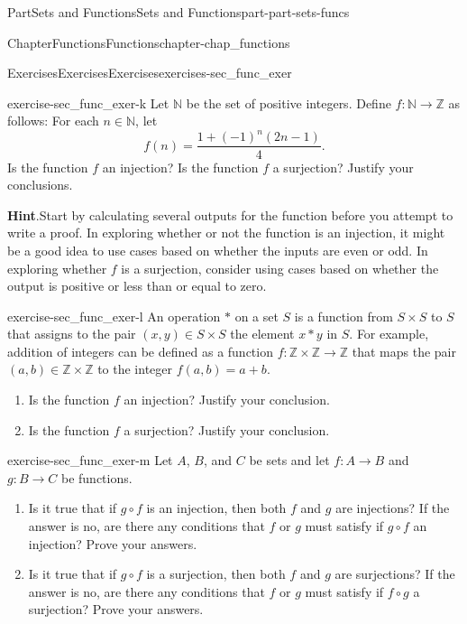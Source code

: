 \documentclass[oneside,10pt,]{book}
\newcommand{\blocktitlefont}{\relax}
\numberwithin{equation}{chapter}
\newcommand{\Z}{\mathbb{Z}}
\newcommand{\N}{\mathbb{N}}
\begin{document}
\begin{partptx}{Part}{Sets and Functions}{}{Sets and Functions}{}{}{part-part-sets-funcs}
\begin{chapterptx}{Chapter}{Functions}{}{Functions}{}{}{chapter-chap_functions}
\begin{exercises-section}{Exercises}{Exercises}{}{Exercises}{}{}{exercises-sec_func_exer}
\begin{divisionexercise}{11}{}{}{exercise-sec_func_exer-k}
Let \(\N\) be the set of positive integers. Define \(f:\N \to \Z\) as follows: For each \(n \in \N\), let%
\begin{equation*}
f(n) = \frac{1 + (-1)^n (2n - 1)}{4}\text{.}
\end{equation*}
Is the function \(f\) an injection? Is the function \(f\) a surjection? Justify your conclusions.%
\par\smallskip%
\noindent\textbf{\blocktitlefont Hint}.\hypertarget{hint-sec_func_exer-k-b}{}\quad{}Start by calculating several outputs for the function before you attempt to write a proof. In exploring whether or not the function is an injection, it might be a good idea to use cases based on whether the inputs are even or odd. In exploring whether \(f\) is a surjection, consider using cases based on whether the output is positive or less than or equal to zero.%
\end{divisionexercise}%
\begin{divisionexercise}{12}{}{}{exercise-sec_func_exer-l}%
An operation \(*\) on a set \(S\) is a function from \(S \times S\) to \(S\) that assigns to the pair \((x,y) \in S \times S\) the element \(x*y\) in \(S\). For example, addition of integers can be defined as a function \(f : \Z \times \Z \to \Z\) that maps the pair \((a,b)\in \Z \times \Z\) to the integer \(f(a,b) = a+b\).%
\begin{enumerate}[font=\bfseries,label=(\alph*),ref=\alph*]%
\item{}Is the function \(f\) an injection? Justify your conclusion.%
\item{}Is the function \(f\) a surjection? Justify your conclusion.%
\end{enumerate}%
\end{divisionexercise}%
\begin{divisionexercise}{13}{}{}{exercise-sec_func_exer-m}%
Let \(A\), \(B\), and \(C\) be sets and let \(f : A \to B\) and \(g : B \to C\) be functions.%
\begin{enumerate}[font=\bfseries,label=(\alph*),ref=\alph*]%
\item{}Is it true that if \(g \circ f\) is an injection, then both \(f\) and \(g\) are injections? If the answer is no, are there any conditions that \(f\) or \(g\) must satisfy if \(g \circ f\) an injection? Prove your answers.%
\item{}Is it true that if \(g \circ f\) is a surjection, then both \(f\) and \(g\) are surjections? If the answer is no, are there any conditions that \(f\) or \(g\) must satisfy if \(f \circ g\) a surjection? Prove your answers.%

\end{enumerate}
\end{divisionexercise}
\end{exercises-section}
\end{chapterptx}
\end{partptx}
\end{document}
